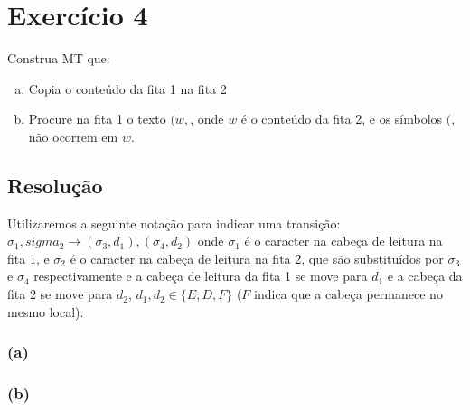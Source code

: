\documentclass{article}
\begin{document}
\section{Exercício 4}

Construa MT que:

\begin{enumerate}[(a)]
	\item Copia o conteúdo da fita 1 na fita 2
	\item Procure na fita 1 o texto $(w,$, onde $w$ é o conteúdo da fita 2, e os símbolos $(,$ não ocorrem em $w$.
\end{enumerate}

\subsection{Resolução}

Utilizaremos a seguinte notação para indicar uma transição: $\sigma_1,sigma_2\rightarrow (\sigma_3, d_1),(\sigma_4, d_2)$ onde $\sigma_1$ é o caracter na cabeça de leitura na fita 1, e $\sigma_2$ é o caracter na cabeça de leitura na fita 2, que são substituídos por $\sigma_3$ e $\sigma_4$ respectivamente e a cabeça de leitura da fita 1 se move para $d_1$ e a cabeça da fita 2 se move para $d_2$, $d_1, d_2\in\{E,D,F\}$ ($F$ indica que a cabeça permanece no mesmo local).

\subsubsection{(a)}

\begin{center}
\end{center}


\subsubsection{(b)}
\end{document}
